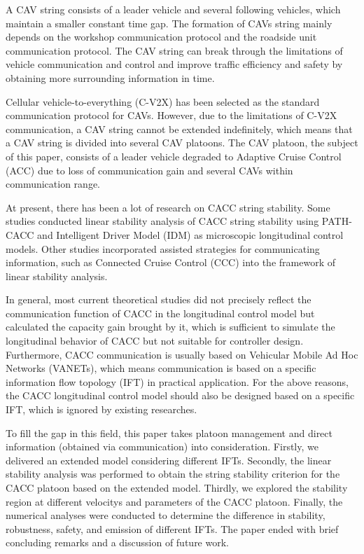 \documentclass[journal]{IEEEtran}
\begin{document}
A CAV string consists of a leader vehicle and several following vehicles, which maintain a smaller constant time gap. The formation of CAVs string mainly depends on the workshop communication protocol and the roadside unit communication protocol. The CAV string can break through the limitations of vehicle communication and control and improve traffic efficiency and safety by obtaining more surrounding information in time.\citep{hall2005vehicle}


Cellular vehicle-to-everything (C-V2X) has been selected as the standard communication protocol for CAVs. However, due to the limitations of C-V2X communication, a CAV string cannot be extended indefinitely, which means that a CAV string is divided into several CAV platoons. The CAV platoon, the subject of this paper, consists of a leader vehicle degraded to Adaptive Cruise Control (ACC) due to loss of communication gain and several CAVs within communication range.


At present, there has been a lot of research on CACC string stability. Some studies conducted linear stability analysis of CACC string stability using PATH-CACC and Intelligent Driver Model (IDM) as microscopic longitudinal control models.\citep{qin2021LWR}\citep{zhou2021impact} Other studies incorporated assisted strategies for communicating information, such as Connected Cruise Control (CCC) into the framework of linear stability analysis.\citep{zhang2020control}\citep{navas2019mixing}


In general, most current theoretical studies did not precisely reflect the communication function of CACC in the longitudinal control model but calculated the capacity gain brought by it, which is sufficient to simulate the longitudinal behavior of CACC but not suitable for controller design. Furthermore, CACC communication is usually based on Vehicular Mobile Ad Hoc Networks (VANETs), which means communication is based on a specific information flow topology (IFT) in practical application. For the above reasons, the CACC longitudinal control model should also be designed based on a specific IFT, which is ignored by existing researches.\citep{wang2020cooperative}\citep{li2020distributed}\citep{zhou2020smooth}


To fill the gap in this field, this paper takes platoon management and direct information (obtained via communication) into consideration. Firstly, we delivered an extended model considering different IFTs. Secondly, the linear stability analysis was performed to obtain the string stability criterion for the CACC platoon based on the extended model. Thirdly, we explored the stability region at different velocitys and parameters of the CACC platoon. Finally, the numerical analyses were conducted to determine the difference in stability, robustness, safety, and emission of different IFTs. The paper ended with brief concluding remarks and a discussion of future work.
\end{document}
